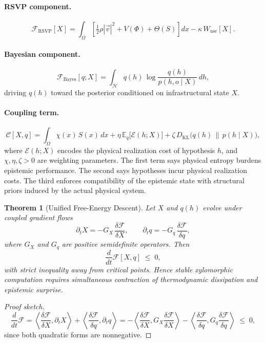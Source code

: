 \documentclass[11pt,a4paper]{article}
\theoremstyle{plain}
\newtheorem{theorem}{Theorem}
\theoremstyle{definition}
\theoremstyle{remark}
\begin{document}
\paragraph{RSVP component.}
\[
  \mathcal{F}_{\mathrm{RSVP}}[X]
  =
  \int_\Omega\!\left[
    \tfrac12 \rho |\vec{v}|^2 + V(\Phi) + \Theta(S)
  \right]dx
  - \kappa\,W_{\mathrm{use}}[X].
\]

\paragraph{Bayesian component.}
\[
  \mathcal{F}_{\mathrm{Bayes}}[q;X]
  =
  \int_{\mathcal{H}}
  q(h)\,\log\frac{q(h)}{p(h,o\mid X)}\,dh,
\]
driving $q(h)$ toward the posterior conditioned on infrastructural state $X$.

\paragraph{Coupling term.}
\[
  \mathcal{C}[X,q]
  =
  \int_\Omega \chi(x)\,S(x)\,dx
  +
  \eta\,\mathbb{E}_q\!\bigl[\mathcal{E}(h;X)\bigr]
  +
  \zeta\,D_{\mathrm{KL}}\!\bigl(q(h)\,\|\,p(h\mid X)\bigr),
\]
where $\mathcal{E}(h;X)$ encodes the physical realization cost of hypothesis $h$,
and $\chi, \eta, \zeta > 0$ are weighting parameters. The first term says
physical entropy burdens epistemic performance. The second says hypotheses incur
physical realization costs. The third enforces compatibility of the epistemic
state with structural priors induced by the actual physical system.

\begin{theorem}[Unified Free-Energy Descent]
\label{thm:unified_free_energy}
Let $X$ and $q(h)$ evolve under coupled gradient flows
\[
  \partial_t X = -G_X\,\frac{\delta \mathcal{F}}{\delta X},
  \qquad
  \partial_t q = -G_q\,\frac{\delta \mathcal{F}}{\delta q},
\]
where $G_X$ and $G_q$ are positive semidefinite operators. Then
\[
  \frac{d}{dt}\mathcal{F}[X,q] \;\leq\; 0,
\]
with strict inequality away from critical points. Hence stable xylomorphic
computation requires simultaneous contraction of thermodynamic dissipation and
epistemic surprise.
\end{theorem}

\begin{proof}[Proof sketch]
\[
  \frac{d}{dt}\mathcal{F}
  =
  \left\langle \frac{\delta \mathcal{F}}{\delta X}, \partial_t X \right\rangle
  +
  \left\langle \frac{\delta \mathcal{F}}{\delta q}, \partial_t q \right\rangle
  =
  -
  \left\langle \frac{\delta \mathcal{F}}{\delta X},
    G_X \frac{\delta \mathcal{F}}{\delta X} \right\rangle
  -
  \left\langle \frac{\delta \mathcal{F}}{\delta q},
    G_q \frac{\delta \mathcal{F}}{\delta q} \right\rangle
  \;\leq\; 0,
\]
since both quadratic forms are nonnegative.
\end{proof}
\end{document}
